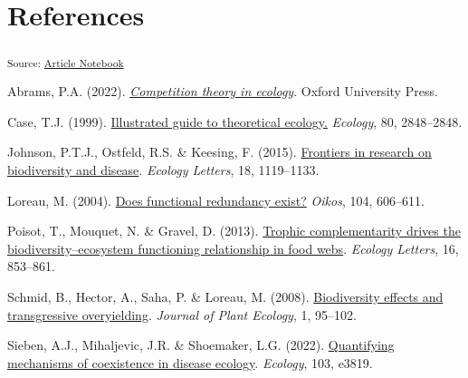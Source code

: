 \documentclass[
  letterpaper,
  DIV=11,
  numbers=noendperiod]{scrartcl}
\newlength{\cslhangindent}
\newenvironment{CSLReferences}[2] %
 {\begin{list}{}{%
  \setlength{\itemindent}{0pt}
  \setlength{\leftmargin}{0pt}
  \setlength{\parsep}{0pt}
  \ifodd #1
   \setlength{\leftmargin}{\cslhangindent}
   \setlength{\itemindent}{-1\cslhangindent}
  \fi
  \setlength{\itemsep}{#2\baselineskip}}}
 {\end{list}}
\begin{document}
\section{References}

\textsubscript{Source:
\href{https://colebrookson.github.io/disease-overyield/index.qmd.html}{Article
Notebook}}

\label{refs}
\begin{CSLReferences}{1}{0}
Abrams, P.A. (2022).
\emph{\href{https://books.google.ca/books?hl=en&lr=&id=fTaFEAAAQBAJ&oi=fnd&pg=PP1&dq=abrams+2022+competition+theory&ots=_cdJwLVcq_&sig=ZUB2hKd4WD_YZsynGVHu114pnJ4}{Competition
theory in ecology}}. Oxford University Press.

Case, T.J. (1999).
\href{https://go.gale.com/ps/i.do?id=GALE\%7CA58517896&sid=googleScholar&v=2.1&it=r&linkaccess=abs&issn=00129658&p=AONE&sw=w}{Illustrated
guide to theoretical ecology.} \emph{Ecology}, 80, 2848--2848.

Johnson, P.T.J., Ostfeld, R.S. \& Keesing, F. (2015).
\href{https://doi.org/10.1111/ele.12479}{Frontiers in research on
biodiversity and disease}. \emph{Ecology Letters}, 18, 1119--1133.

Loreau, M. (2004).
\href{https://doi.org/10.1111/j.0030-1299.2004.12685.x}{Does functional
redundancy exist?} \emph{Oikos}, 104, 606--611.

Poisot, T., Mouquet, N. \& Gravel, D. (2013).
\href{https://doi.org/10.1111/ele.12118}{Trophic complementarity drives
the biodiversity--ecosystem functioning relationship in food webs}.
\emph{Ecology Letters}, 16, 853--861.

Schmid, B., Hector, A., Saha, P. \& Loreau, M. (2008).
\href{https://academic.oup.com/jpe/article-abstract/1/2/95/989985}{Biodiversity
effects and transgressive overyielding}. \emph{Journal of Plant
Ecology}, 1, 95--102.

Sieben, A.J., Mihaljevic, J.R. \& Shoemaker, L.G. (2022).
\href{https://doi.org/10.1002/ecy.3819}{Quantifying mechanisms of
coexistence in disease ecology}. \emph{Ecology}, 103, e3819.

\end{CSLReferences}
\end{document}
